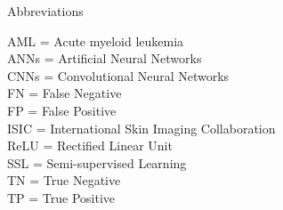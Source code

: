 \thispagestyle{empty}

{ Abbreviations}

\vspace{10mm}

AML = Acute myeloid leukemia \\

ANNs = Artificial Neural Networks \\

CNNs = Convolutional Neural Networks \\

FN = False Negative \\

FP = False Positive \\

ISIC = International Skin Imaging Collaboration \\

ReLU = Rectified Linear Unit \\

SSL = Semi-supervised Learning \\

TN = True Negative \\

TP = True Positive \\

\cleardoublepage{}
